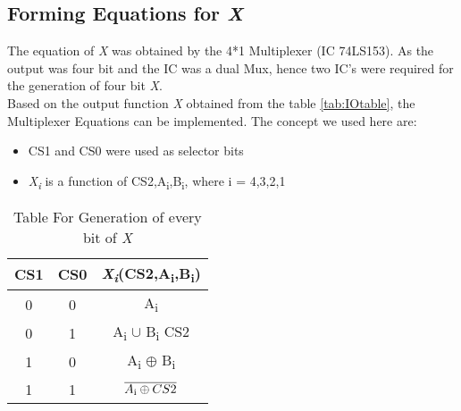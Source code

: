 \documentclass[12pt]{article}
\begin{document}

\subsection{Forming Equations for \textit{X}}

The equation of \textit{X} was obtained by the 4*1 Multiplexer (IC 74LS153). As the output was four bit and the IC was a dual Mux, hence two IC's were required for the generation of four bit \textit{X}.\\

Based on the output function \textit{X} obtained from the table \ref{tab:IOtable}, the Multiplexer Equations can be implemented. The concept we used here are:

\begin{itemize}
    \item[\ding{228}]{CS1 and CS0 were used as selector bits }
    \item[\ding{228}]{\textit{X\textsubscript{i}} is a function of CS2,A\textsubscript{i},B\textsubscript{i}, where i = 4,3,2,1}
\end{itemize}

\renewcommand{\arraystretch}{1}

\begin{table}[H]

    \centering
    \begin{adjustbox}{width =.6 \textwidth}
    
    \begin{tabular}{|c c|c|}
    \hline
    CS1 & CS0 & \textit{X\textsubscript{i}}(CS2,A\textsubscript{i},B\textsubscript{i})\\

    \hline

    0 & 0 & A\textsubscript{i}\\

    0 & 1 & A\textsubscript{i} $\cup$ B\textsubscript{i} CS2\\

    1 & 0 & A\textsubscript{i} $\oplus$ B\textsubscript{i}\\

    1 & 1 & $\overline{A\textsubscript{i} \oplus CS2}$\\

    \hline
    
    \end{tabular}
    
    \end{adjustbox}
    \caption{Table For Generation of every bit of \textit{X}}
    \label{tab:Xtable}
\end{table} 
\end{document}
